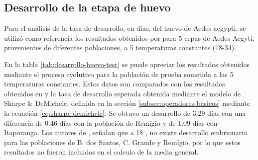 \subsection{Desarrollo de la etapa de huevo}
Para el análisis de la tasa de desarrollo, en días, del huevo de Aedes aegypti, se utilizó como
referencia los resultados obtenidos por \cite{BESERRA2006} para 5 cepas de Aedes Aegyti, provenientes de
diferentes poblaciones, a 5 temperaturas constantes (18-34\textcelsius).

En la tabla \ref{tab:desarrollo-huevo-test} se puede apreciar los resultados obtenidos mediante el
proceso evolutivo para la población de prueba sometida a las 5 temperaturas constantes. Estos datos son
comparados con los resultados obtenidos en \cite{BESERRA2006} y la tasa de desarrollo esperada obtenida
mediante el modelo de Sharpe \& DeMichele, definida en la sección \ref{subsec:operadores-basicos}
mediante la ecuación \eqref{eq:sharpe-demichele}. Se obtuvo un desarrollo de 3.29 días con 
una diferencia de 0.46 días con la población de Remígio y de 1.09 días con Itaporanga. Los autores de
\cite{BESERRA2006}, señalan que a 18 \textcelsius, no existe desarrollo embrionario para las poblaciones
de B. dos Santos, C. Grande y Remígio, por lo que estos resultados no fueron incluidos en el calculo de
la media general. 

